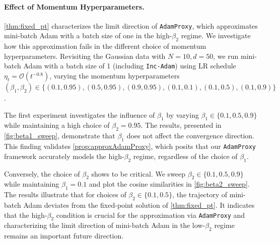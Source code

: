 \documentclass{article} %
\theoremstyle{plain}
\theoremstyle{definition}
\theoremstyle{remark}
\begin{document}
\paragraph{Effect of Momentum Hyperparameters.}
\cref{thm:fixed_pt} characterizes the limit direction of \texttt{AdamProxy}, which approximates mini-batch Adam with a batch size of one in the high-$\beta_2$ regime. We investigate how this approximation fails in the different choice of momentum hyperparameters. Revisiting the Gaussian data with $N=10, d=50$, we run mini-batch Adam with a batch size of 1 (including \texttt{Inc-Adam}) using LR schedule $\eta_t = \mathcal{O}(t^{-0.8})$, varying the momentum hyperparameters $(\beta_1, \beta_2) \in \{(0.1, 0.95), (0.5, 0.95), (0.9, 0.95), (0.1, 0.1), (0.1, 0.5), (0.1, 0.9)\}$.

The first experiment investigates the influence of $\beta_1$ by varying $\beta_1 \in \{0.1, 0.5, 0.9\}$ while maintaining a high choice of $\beta_2=0.95$. The results, presented in \cref{fig:beta1_sweep}, demonstrate that $\beta_1$ does not affect the convergence direction. This finding validates \cref{prop:approxAdamProxy}, which posits that our \texttt{AdamProxy} framework accurately models the high-$\beta_2$ regime, regardless of the choice of $\beta_1$. 

Conversely, the choice of $\beta_2$ shows to be critical. We sweep $\beta_2 \in \{0.1, 0.5, 0.9\}$ while maintaining $\beta_1=0.1$ and plot the cosine similarities in \cref{fig:beta2_sweep}. The results illustrate that for choices of $\beta_2 \in \{0.1, 0.5\}$, the trajectory of mini-batch Adam deviates from the fixed-point solution of \cref{thm:fixed_pt}. It indicates that the high-$\beta_2$ condition is crucial for the approximation via \texttt{AdamProxy} and characterizing the limit direction of mini-batch Adam in the low-$\beta_2$ regime remains an important future direction.
\end{document}
